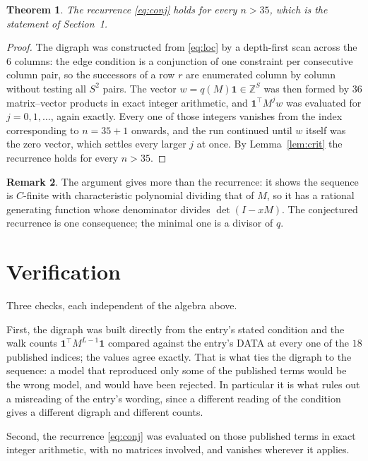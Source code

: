 \documentclass[11pt,a4paper]{article}
\theoremstyle{plain}
\newtheorem{theorem}{Theorem}
\theoremstyle{definition}
\newtheorem{remark}[theorem]{Remark}
\begin{document}
\begin{theorem}
The recurrence \eqref{eq:conj} holds for every $n>35$, which is the statement of
Section~1.
\end{theorem}

\begin{proof}
The digraph was constructed from \eqref{eq:loc} by a depth-first scan across the $6$
columns: the edge condition is a conjunction of one constraint per consecutive column
pair, so the successors of a row $r$ are enumerated column by column without testing all
$S^2$ pairs. The vector $w=q(M)\mathbf{1}\in\mathbb{Z}^{S}$ was then formed by $36$
matrix--vector products in exact integer arithmetic, and $\mathbf{1}^{\!\top}M^{j}w$ was
evaluated for $j=0,1,\dots$, again exactly. Every one of those integers vanishes from the
index corresponding to $n=35+1$ onwards, and the run continued until $w$ itself was the
zero vector, which settles every larger $j$ at once. By Lemma~\ref{lem:crit} the recurrence
holds for every $n>35$.
\end{proof}

\begin{remark}
The argument gives more than the recurrence: it shows the sequence is $C$-finite with
characteristic polynomial dividing that of $M$, so it has a rational generating function
whose denominator divides $\det(I-xM)$. The conjectured recurrence is one consequence; the
minimal one is a divisor of $q$.
\end{remark}

\section{Verification}

Three checks, each independent of the algebra above.

First, the digraph was built directly from the entry's stated condition and the walk counts
$\mathbf{1}^{\!\top}M^{L-1}\mathbf{1}$ compared against the entry's DATA at
every one of the $18$ published indices; the values agree exactly. That is what ties
the digraph to the sequence: a model that reproduced only some of the published terms would
be the wrong model, and would have been rejected. In particular it is what rules out a
misreading of the entry's wording, since a different reading of the condition gives a
different digraph and different counts.

Second, the recurrence \eqref{eq:conj} was evaluated on those published terms in exact
integer arithmetic, with no matrices involved, and vanishes wherever it applies.
\end{document}
